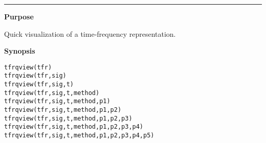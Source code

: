 

\hspace*{-1.6cm}{\Large \bf tfrqview}

\vspace*{-.4cm}
\hspace*{-1.6cm}\rule[0in]{16.5cm}{.02cm}
\vspace*{.2cm}

{\bf \large {}\selectfont Purpose}\\
\hspace*{1.5cm}
\begin{minipage}[t]{13.5cm}
Quick visualization of a time-frequency representation.
\end{minipage}
\vspace*{.5cm}

{\bf \large {}\selectfont Synopsis}\\
\hspace*{1.5cm}
\begin{minipage}[t]{13.5cm}
\begin{verbatim}
tfrqview(tfr)
tfrqview(tfr,sig)
tfrqview(tfr,sig,t)
tfrqview(tfr,sig,t,method)
tfrqview(tfr,sig,t,method,p1)
tfrqview(tfr,sig,t,method,p1,p2)
tfrqview(tfr,sig,t,method,p1,p2,p3)
tfrqview(tfr,sig,t,method,p1,p2,p3,p4)
tfrqview(tfr,sig,t,method,p1,p2,p3,p4,p5)
\end{verbatim}
\end{minipage}
\vspace*{.5cm}

